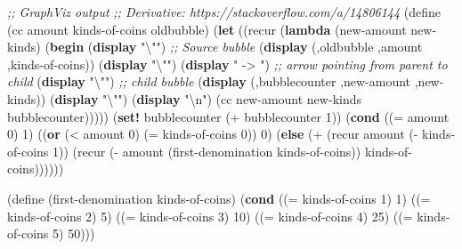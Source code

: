 \documentclass[
]{article}
\newenvironment{Shaded}{}{}
\newcommand{\CharTok}[1]{\textcolor[rgb]{0.25,0.44,0.63}{#1}}
\newcommand{\CommentTok}[1]{\textcolor[rgb]{0.38,0.63,0.69}{\textit{#1}}}
\newcommand{\DecValTok}[1]{\textcolor[rgb]{0.25,0.63,0.44}{#1}}
\newcommand{\ExtensionTok}[1]{#1}
\newcommand{\FunctionTok}[1]{\textcolor[rgb]{0.02,0.16,0.49}{#1}}
\newcommand{\KeywordTok}[1]{\textcolor[rgb]{0.00,0.44,0.13}{\textbf{#1}}}
\newcommand{\NormalTok}[1]{#1}
\newcommand{\OperatorTok}[1]{\textcolor[rgb]{0.40,0.40,0.40}{#1}}
\newcommand{\StringTok}[1]{\textcolor[rgb]{0.25,0.44,0.63}{#1}}
\begin{document}
\begin{Shaded}
\begin{Highlighting}[numbers=left,,]
\CommentTok{;; GraphViz output}
\CommentTok{;; Derivative: https://stackoverflow.com/a/14806144}
\NormalTok{(}\ExtensionTok{define}\FunctionTok{ }\NormalTok{(cc amount kinds{-}of{-}coins oldbubble)}
\NormalTok{  (}\KeywordTok{let}\NormalTok{ ((recur (}\KeywordTok{lambda}\NormalTok{ (new{-}amount new{-}kinds)}
\NormalTok{                 (}\KeywordTok{begin}
\NormalTok{                   (}\KeywordTok{display} \StringTok{"}\CharTok{\textbackslash{}"}\StringTok{"}\NormalTok{) }\CommentTok{;; Source bubble}
\NormalTok{                   (}\KeywordTok{display}\NormalTok{ \textasciigrave{}(,oldbubble ,amount ,kinds{-}of{-}coins))}
\NormalTok{                   (}\KeywordTok{display} \StringTok{"}\CharTok{\textbackslash{}"}\StringTok{"}\NormalTok{)}
\NormalTok{                   (}\KeywordTok{display} \StringTok{" {-}\textgreater{} "}\NormalTok{) }\CommentTok{;; arrow pointing from parent to child}
\NormalTok{                   (}\KeywordTok{display} \StringTok{"}\CharTok{\textbackslash{}"}\StringTok{"}\NormalTok{) }\CommentTok{;; child bubble}
\NormalTok{                   (}\KeywordTok{display}\NormalTok{ \textasciigrave{}(,bubblecounter ,new{-}amount ,new{-}kinds))}
\NormalTok{                   (}\KeywordTok{display} \StringTok{"}\CharTok{\textbackslash{}"}\StringTok{"}\NormalTok{)}
\NormalTok{                   (}\KeywordTok{display} \StringTok{"}\CharTok{\textbackslash{}n}\StringTok{"}\NormalTok{)}
\NormalTok{                   (cc new{-}amount new{-}kinds bubblecounter)))))}
\NormalTok{    (}\KeywordTok{set!}\NormalTok{ bubblecounter (}\OperatorTok{+}\NormalTok{ bubblecounter }\DecValTok{1}\NormalTok{))}
\NormalTok{    (}\KeywordTok{cond}\NormalTok{ ((}\OperatorTok{=}\NormalTok{ amount }\DecValTok{0}\NormalTok{) }\DecValTok{1}\NormalTok{)}
\NormalTok{          ((}\KeywordTok{or}\NormalTok{ (}\OperatorTok{\textless{}}\NormalTok{ amount }\DecValTok{0}\NormalTok{) (}\OperatorTok{=}\NormalTok{ kinds{-}of{-}coins }\DecValTok{0}\NormalTok{)) }\DecValTok{0}\NormalTok{)}
\NormalTok{          (}\KeywordTok{else}\NormalTok{ (}\OperatorTok{+}
\NormalTok{                 (recur amount (}\OperatorTok{{-}}\NormalTok{ kinds{-}of{-}coins }\DecValTok{1}\NormalTok{))}
\NormalTok{                 (recur (}\OperatorTok{{-}}\NormalTok{ amount}
\NormalTok{                           (first{-}denomination kinds{-}of{-}coins))}
\NormalTok{                        kinds{-}of{-}coins))))))}

\NormalTok{(}\ExtensionTok{define}\FunctionTok{ }\NormalTok{(first{-}denomination kinds{-}of{-}coins)}
\NormalTok{  (}\KeywordTok{cond}\NormalTok{ ((}\OperatorTok{=}\NormalTok{ kinds{-}of{-}coins }\DecValTok{1}\NormalTok{) }\DecValTok{1}\NormalTok{)}
\NormalTok{        ((}\OperatorTok{=}\NormalTok{ kinds{-}of{-}coins }\DecValTok{2}\NormalTok{) }\DecValTok{5}\NormalTok{)}
\NormalTok{        ((}\OperatorTok{=}\NormalTok{ kinds{-}of{-}coins }\DecValTok{3}\NormalTok{) }\DecValTok{10}\NormalTok{)}
\NormalTok{        ((}\OperatorTok{=}\NormalTok{ kinds{-}of{-}coins }\DecValTok{4}\NormalTok{) }\DecValTok{25}\NormalTok{)}
\NormalTok{        ((}\OperatorTok{=}\NormalTok{ kinds{-}of{-}coins }\DecValTok{5}\NormalTok{) }\DecValTok{50}\NormalTok{)))}
\end{Highlighting}
\end{Shaded}
\end{document}
